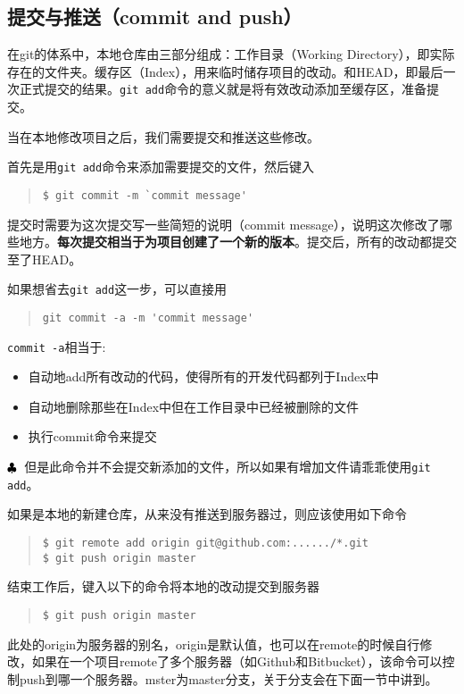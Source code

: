 \documentclass{article}
\begin{document}
		\subsection{提交与推送（commit and push）} %
		\label{sub:提交与推送_commit_and_push_}
			\par 在git的体系中，本地仓库由三部分组成：工作目录（Working Directory），即实际存在的文件夹。缓存区（Index），用来临时储存项目的改动。和HEAD，即最后一次正式提交的结果。{\tt git add}命令的意义就是将有效改动添加至缓存区，准备提交。
			\par 当在本地修改项目之后，我们需要提交和推送这些修改。
			\par 首先是用{\tt git add}命令来添加需要提交的文件，然后键入
			\begin{quote}
				\begin{lstlisting}
$ git commit -m `commit message'
				\end{lstlisting}
			\end{quote}
			提交时需要为这次提交写一些简短的说明（commit message），说明这次修改了哪些地方。{\bf 每次提交相当于为项目创建了一个新的版本}。提交后，所有的改动都提交至了HEAD。
			\par 如果想省去{\tt git add}这一步，可以直接用
			\begin{quote}
				\begin{lstlisting}
git commit -a -m 'commit message'
				\end{lstlisting}
			\end{quote}
			{\tt commit -a}相当于:
			\begin{itemize}
				\item 自动地add所有改动的代码，使得所有的开发代码都列于Index中
				\item 自动地删除那些在Index中但在工作目录中已经被删除的文件
				\item 执行commit命令来提交
			\end{itemize}
			\textcolor{red}{$\bf\clubsuit$}~但是此命令并不会提交新添加的文件，所以如果有增加文件请乖乖使用{\tt git add}。
			\par 如果是本地的新建仓库，从来没有推送到服务器过，则应该使用如下命令
			\begin{quote}
				\begin{lstlisting}
$ git remote add origin git@github.com:....../*.git
$ git push origin master
				\end{lstlisting}
			\end{quote}
			\par 结束工作后，键入以下的命令将本地的改动提交到服务器
			\begin{quote}
				\begin{lstlisting}
$ git push origin master
				\end{lstlisting}
			\end{quote}
			此处的origin为服务器的别名，origin是默认值，也可以在remote的时候自行修改，如果在一个项目remote了多个服务器（如Github和Bitbucket），该命令可以控制push到哪一个服务器。mster为master分支，关于分支会在下面一节中讲到。
\end{document}
